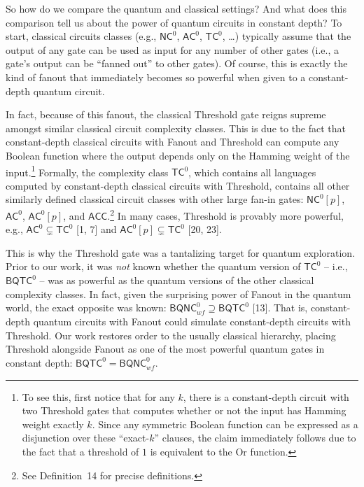 So how do we compare the quantum and classical settings? And what does this comparison tell us about the power of quantum circuits in constant depth? To start, classical circuits classes (e.g., ${\mathsf{NC}}^{0}$, ${\mathsf{AC}}^{0}$, ${\mathsf{TC}}^{0}$, …) typically assume that the output of any gate can be used as input for any number of other gates (i.e., a gate’s output can be “fanned out” to other gates). Of course, this is exactly the kind of fanout that immediately becomes so powerful when given to a constant-depth quantum circuit.\par




In fact, because of this fanout, the classical Threshold gate reigns supreme amongst similar classical circuit complexity classes. This is due to the fact that constant-depth classical circuits with Fanout and Threshold can compute any Boolean function where the output depends only on the Hamming weight of the input.\footnote{To see this, first notice that for any $k$, there is a constant-depth circuit with two Threshold gates that computes whether or not the input has Hamming weight exactly $k$. Since any symmetric Boolean function can be expressed as a disjunction over these “exact-$k$” clauses, the claim immediately follows due to the fact that a threshold of $1$ is equivalent to the Or function.} Formally, the complexity class ${\mathsf{TC}}^{0}$, which contains all languages computed by constant-depth classical circuits with Threshold, contains all other similarly defined classical circuit classes with other large fan-in gates: ${\mathsf{NC}}^{0}[p]$, ${\mathsf{AC}}^{0}$, ${\mathsf{AC}}^{0}[p]$, and ${\mathsf{ACC}}$.\footnote{See Definition 14 for precise definitions.} In many cases, Threshold is provably more powerful, e.g., ${\mathsf{AC}}^{0}\subsetneq{\mathsf{TC}}^{0}$ [1, 7] and ${\mathsf{AC}}^{0}[p]\subsetneq{\mathsf{TC}}^{0}$ [20, 23].\par




This is why the Threshold gate was a tantalizing target for quantum exploration. Prior to our work, it was \emph{not} known whether the quantum version of ${\mathsf{TC}}^{0}$ – i.e., ${\mathsf{BQTC}}^{0}$ – was as powerful as the quantum versions of the other classical complexity classes. In fact, given the surprising power of Fanout in the quantum world, the exact opposite was known: ${\mathsf{BQNC}}^{0}_{wf}\supseteq{\mathsf{BQTC}}^{0}$ [13]. That is, constant-depth quantum circuits with Fanout could simulate constant-depth circuits with Threshold. Our work restores order to the usually classical hierarchy, placing Threshold alongside Fanout as one of the most powerful quantum gates in constant depth: ${\mathsf{BQTC}}^{0}={\mathsf{BQNC}}^{0}_{wf}$.\par





